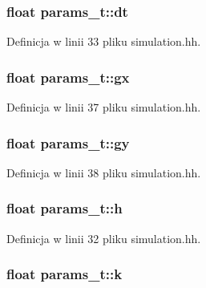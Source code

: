 \subsubsection[{dt}]{\setlength{\rightskip}{0pt plus 5cm}float params\+\_\+t\+::dt}\label{structparams__t_a81fc6596e9b1446442ebf3eef2c3fb01}


Definicja w linii 33 pliku simulation.\+hh.

\hypertarget{structparams__t_a9f3f70c0cdedcb053c9d45c2e41e67b6}{}
\subsubsection[{gx}]{\setlength{\rightskip}{0pt plus 5cm}float params\+\_\+t\+::gx}\label{structparams__t_a9f3f70c0cdedcb053c9d45c2e41e67b6}


Definicja w linii 37 pliku simulation.\+hh.

\hypertarget{structparams__t_a0da484b4cc6a542875aa7b92e200f507}{}
\subsubsection[{gy}]{\setlength{\rightskip}{0pt plus 5cm}float params\+\_\+t\+::gy}\label{structparams__t_a0da484b4cc6a542875aa7b92e200f507}


Definicja w linii 38 pliku simulation.\+hh.

\hypertarget{structparams__t_a27d76064f2ae0cb93a0956027cfcc19b}{}
\subsubsection[{h}]{\setlength{\rightskip}{0pt plus 5cm}float params\+\_\+t\+::h}\label{structparams__t_a27d76064f2ae0cb93a0956027cfcc19b}


Definicja w linii 32 pliku simulation.\+hh.

\hypertarget{structparams__t_a97ee2783cf89cee1151be3250e9054b3}{}
\subsubsection[{k}]{\setlength{\rightskip}{0pt plus 5cm}float params\+\_\+t\+::k}\label{structparams__t_a97ee2783cf89cee1151be3250e9054b3}


